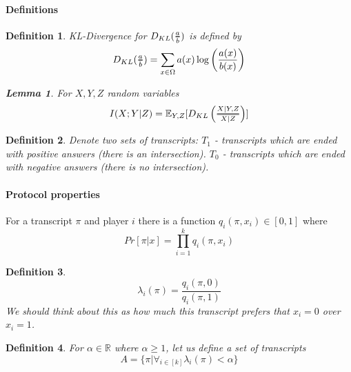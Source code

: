 \documentclass{article}
\newcommand{\Dfrac}[2]{%
  \ooalign{%
    $\genfrac{}{}{1.2pt}1{#1}{#2}$\cr%
    $\color{white}\genfrac{}{}{.4pt}1{\phantom{#1}}{\phantom{#2}}$}%
}
\theoremstyle{plain}
\newtheorem{lemma}[theorem]{Lemma}
\newtheorem{definition}{Definition}
\begin{document}
\paragraph{Definitions}

\begin{definition}
KL-Divergence for $D_{KL}(\Dfrac{a}{b})$ is defined by
\begin{equation*} 
    D_{KL}(\Dfrac{a}{b}) = \sum_{x \in \Omega} a(x)\log \left(\frac{a(x)}{b(x)}\right)
\end{equation*}

\begin{lemma}
    For $X, Y, Z$ random variables
    \begin{equation*}
        I(X;Y|Z) = \mathbb{E}_{Y,Z}[D_{KL}\left(\Dfrac{X|Y,Z}{X|Z}\right)]
    \end{equation*}
\end{lemma}

\end{definition}

\begin{definition}
    Denote two sets of transcripts: \newline
    $T_1$ - transcripts which are ended with positive answers (there is an intersection). \newline
    $T_0$ - transcripts which are ended with negative answers (there is no intersection).
\end{definition}

\paragraph{Protocol properties}
For a transcript $\pi$ and player $i$ there is a function $q_i(\pi, x_i) \in [0,1]$ where
\begin{equation*}
    Pr[\pi | x] = \prod_{i=1}^{k}q_i(\pi, x_i )
\end{equation*}

\begin{definition}
\begin{equation*}
    \lambda _i (\pi) = \frac{q_i(\pi, 0)}{q_i(\pi, 1)}
\end{equation*}
We should think about this as how much this transcript prefers that $x_i = 0$ over $x_i = 1$.
\end{definition}

\begin{definition}
For $\alpha \in \mathbb{R}$ where $\alpha \geq 1$, let us define a set of transcripts 
\begin{equation*}
    A = \{\pi | \forall_{i \in [k]} \lambda_i (\pi) < \alpha \}
\end{equation*}
\end{definition}
\end{document}
